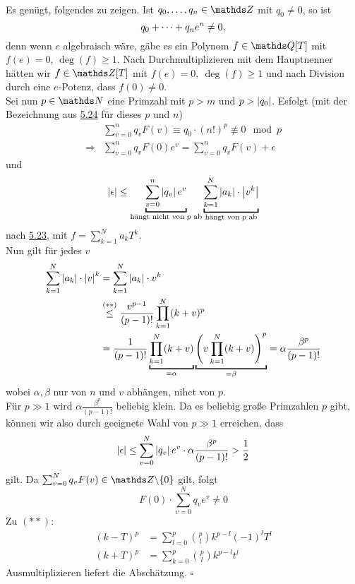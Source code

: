 \\
Es genügt, folgendes zu zeigen.
Ist $q_0\dt{,}q_n\in \Z$ mit $q_0\neq 0$, so ist
\[
q_0+ \dots +q_ne^n \neq 0,
\]
denn wenn $e$ algebraisch wäre, gäbe es ein Polynom $f\in \Q[T]$ mit $f(e)=0$, $\deg(f)\ge 1$.
Nach Durchmultiplizieren mit dem Hauptnenner hätten wir $f\in \Z[T]$ mit $f(e)=0,~\deg(f)\ge 1$ und nach Division durch eine $e$-Potenz, dass $f(0)\neq 0$.\\
Sei nun $p\in \N$ eine Primzahl mit $p>m$ und $p>\left\vert q_0\right\vert$.
Esfolgt (mit der Bezeichnung aus \hyperref[sub:bemerkung_nullstellen]{5.24} für dieses $p$ und $n$)
\begin{equation*}
\begin{aligned}
	&\sum_{v=0}^{n}q_vF(v)\equiv q_0\cdot (n!)^p\not\equiv 0 \mod{p}\\
	\Rightarrow &\sum_{v=0}^n q_vF(0)e^v=\sum_{v=0}^{n}q_vF(v)+\epsilon
\end{aligned}
\end{equation*}
und
\[
\abs{\epsilon}\le \underbracket{\sum_{v=0}^{n}\abs{q_v}e^v}_{\text{hängt nicht von $p$ ab}}\underbracket{\sum_{k=1}^{N}\abs{a_k}\cdot\abs{v^k}}_{\text{hängt von $p$ ab}}
\]
nach \hyperref[sub:lemma_14]{5.23}, mit $f=\sum_{k=1}^{N}a_kT^k$.\\
Nun gilt für jedes $v$
\begin{equation*}
\begin{aligned}
	\sum_{k=1}^{N}\abs{a_k}\cdot\abs{v}^k &= \sum_{k=1}^{N}\abs{a_k}\cdot v^k\\
	&\stackrel{(\ast\ast)}{\le} \frac{v^{p-1}}{(p-1)!}\prod_{k=1}^N(k+v)^p\\
	&= \frac{1}{(p-1)!}\underbracket{\prod_{k=1}^{N}(k+v)}_{=\alpha}\underbracket{\enbrace{v\prod_{k=1}^{N}(k+v)}^p}_{=\beta} = \alpha\frac{\beta^p}{(p-1)!}
\end{aligned}
\end{equation*}
wobei $\alpha, \beta$ nur von $n$ und $v$ abhängen, nihct von $p$.\\
Für $p\gg 1$ wird $\alpha\frac{\beta^p}{(p-1)!}$ beliebig klein.
Da es beliebig große Primzahlen $p$ gibt, können wir also durch geeignete Wahl von $p\gg 1$ erreichen, dass
\[
\left\vert\epsilon\right\vert\le \sum_{v=0}^{N}\left\vert q_v\right\vert e^v\cdot \alpha\frac{\beta^p}{(p-1)!}>\frac{1}{2}
\]
gilt.
Da $\sum_{v=0}^{N}q_vF(v)\in \Z\backslash\{0\}$ gilt, folgt
\[
F(0)\cdot \sum_{v=0}^{N}q_ve^v\neq 0
\]
Zu $(\ast\ast)$:
\begin{equation*}
\begin{aligned}
	(k-T)^p &= \sum_{l=0}^{p}\binom{p}{l}k^{p-l}(-1)^lT^l\\
	(k+T)^p &= \sum_{k=0}^{p}\binom{p}{l}k^{p-l}t^l
\end{aligned}
\end{equation*}
Ausmultiplizieren liefert die Abschätzung.
\hfill $\square$\\

